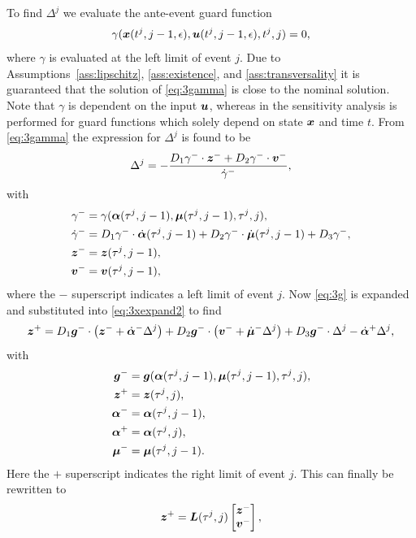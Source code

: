\documentclass[../DC2017114Bouma.tex]{subfiles}
\begin{document}
To find $\Delta^{j}$ we evaluate the ante-event guard function
\begin{align}
\gamma({\boldsymbol{x}}(t^{j},j-1,\epsilon),{\boldsymbol{u}}(t^{j},j-1,\epsilon),t^{j},j) = 0,\label{eq:3gamma}
\end{align}
where $\gamma$ is evaluated at the left limit of event $j$. Due to Assumptions~\ref{ass:lipschitz}, \ref{ass:existence}, and \ref{ass:transversality} it is guaranteed that the solution of \eqref{eq:3gamma} is close to the nominal solution. Note that $\gamma$ is dependent on the input ${\boldsymbol{u}}$, whereas in \cite{Chen2018a} the sensitivity analysis is performed for guard functions which solely depend on state ${\boldsymbol{x}}$ and time $t$. From \eqref{eq:3gamma} the expression for $\Delta^{j}$ is found to be
\begin{align}
\Delta^{j} = -\frac{D_1\gamma^{-}\cdot{\boldsymbol{z}}^- + D_2\gamma^{-}\cdot{\boldsymbol{v}}^-}{\dot{\gamma}^{-}},\label{eq}
\end{align}
with
\begin{align}
\gamma^- &= \gamma(\boldsymbol{\alpha}(\tau^j,j-1),\boldsymbol{\mu}(\tau^j,j-1),\tau^j,j),\\
\dot{\gamma}^- &= D_1\gamma^-\cdot\dot{\boldsymbol{\alpha}}(\tau^j,j-1) + D_2\gamma^-\cdot\dot{\boldsymbol{\mu}}(\tau^j,j-1) + D_3\gamma^-,\\
{\boldsymbol{z}}^- &= {\boldsymbol{z}}(\tau^j,j-1),\\
{\boldsymbol{v}}^- &= {\boldsymbol{v}}(\tau^j,j-1),
\end{align}
where the $-$ superscript indicates a left limit of event $j$. Now \eqref{eq:3g} is expanded and substituted  into \eqref{eq:3xexpand2} to find
\begin{equation}
{\boldsymbol{z}}^+ = D_1{\boldsymbol{g}}^-\cdot\left({\boldsymbol{z}}^- + \dot{\boldsymbol{\alpha}}^-\Delta^j\right) + D_2{\boldsymbol{g}}^-\cdot\left({\boldsymbol{v}}^- + \dot{\boldsymbol{\mu}}^-\Delta^j\right) + D_3{\boldsymbol{g}}^-\cdot\Delta^j - \dot{\boldsymbol{\alpha}}^+\Delta^j,
\end{equation}
with
\begin{align}
{\boldsymbol{g}}^- &= {\boldsymbol{g}}(\boldsymbol{\alpha}(\tau^j,j-1),\boldsymbol{\mu}(\tau^j,j-1),\tau^j,j),\\
{\boldsymbol{z}}^+ &= {\boldsymbol{z}}(\tau^j,j),\\
\boldsymbol{\alpha}^- &= \boldsymbol{\alpha}(\tau^j,j-1),\\
\boldsymbol{\alpha}^+ &= \boldsymbol{\alpha}(\tau^j,j),\\
\boldsymbol{\mu}^- &= \boldsymbol{\mu}(\tau^j,j-1).
\end{align}
Here the $+$ superscript indicates the right limit of event $j$. This can finally be rewritten to
\begin{align}
{\boldsymbol{z}}^+ = {\boldsymbol{L}}(\tau^j,j)\begin{bmatrix}
{\boldsymbol{z}}^- \\ {\boldsymbol{v}}^-
\end{bmatrix},
\end{align}
\end{document}
